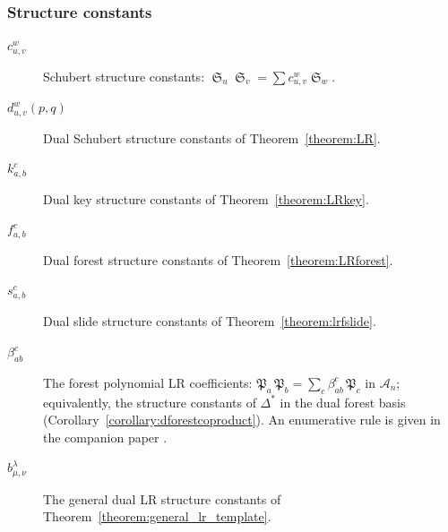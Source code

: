 \documentclass{amsart}
\theoremstyle{definition}
\theoremstyle{remark}
\numberwithin{equation}{subsection}
\DeclareMathOperator{\sch}{\mathfrak{S}}
\newcommand{\coma}{\mathcal{A}}
\newcommand{\forest}{\mathfrak{P}}
\begin{document}
\subsubsection*{Structure constants}
\begin{description}
\item[$c_{u,v}^w$] Schubert structure constants: $\sch_u\sch_v=\sum c_{u,v}^w\sch_w$.
\item[$d_{u,v}^w(p,q)$] Dual Schubert structure constants of Theorem~\ref{theorem:LR}.
\item[$k_{a,b}^c$] Dual key structure constants of Theorem~\ref{theorem:LRkey}.
\item[$f_{a,b}^c$] Dual forest structure constants of Theorem~\ref{theorem:LRforest}.
\item[$s_{a,b}^c$] Dual slide structure constants of Theorem~\ref{theorem:lrfslide}.
\item[$\beta_{ab}^c$] The forest polynomial LR coefficients: $\forest_a\,\forest_b=\sum_c\beta_{ab}^c\,\forest_c$ in $\coma_n$; equivalently, the structure constants of $\Delta^*$ in the dual forest basis (Corollary~\ref{corollary:dforestcoproduct}). An enumerative rule is given in the companion paper \cite{companionforest}.
\item[$b_{\mu,\nu}^\lambda$] The general dual LR structure constants of Theorem~\ref{theorem:general_lr_template}.
\end{description}
\end{document}
